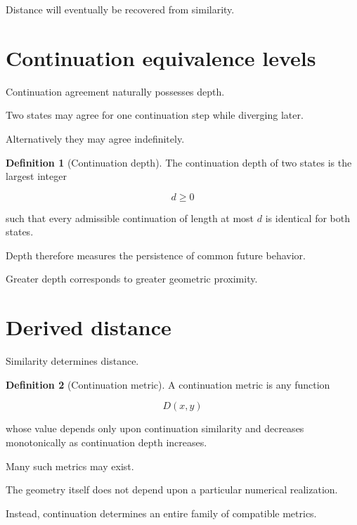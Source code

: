 \documentclass[13pt,openany]{book}
\theoremstyle{plain}
\theoremstyle{definition}
\newtheorem{definition}{Definition}[chapter]
\begin{document}
Distance will eventually be recovered from similarity.


\section{Continuation equivalence levels}

Continuation agreement naturally possesses depth.

Two states may agree for one continuation step while diverging later.

Alternatively they may agree indefinitely.

\begin{definition}[Continuation depth]
The continuation depth of two states is the largest integer

\[
d\ge0
\]

such that every admissible continuation of length at most $d$ is identical for both states.
\end{definition}

Depth therefore measures the persistence of common future behavior.

Greater depth corresponds to greater geometric proximity.


\section{Derived distance}

Similarity determines distance.

\begin{definition}[Continuation metric]
A continuation metric is any function

\[
D(x,y)
\]

whose value depends only upon continuation similarity and decreases monotonically as continuation depth increases.
\end{definition}

Many such metrics may exist.

The geometry itself does not depend upon a particular numerical realization.

Instead, continuation determines an entire family of compatible metrics.

\end{document}
